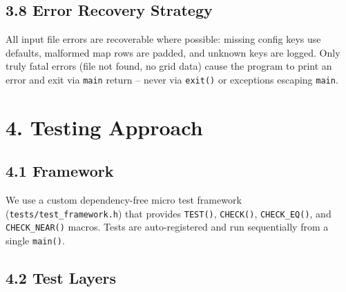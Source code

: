 \documentclass[12pt,a4paper]{article}
\begin{document}
\subsection{3.8 Error Recovery Strategy}

All input file errors are recoverable where possible: missing config keys use
defaults, malformed map rows are padded, and unknown keys are logged. Only truly
fatal errors (file not found, no grid data) cause the program to print an error
and exit via \texttt{main} return -- never via \texttt{exit()} or exceptions
escaping \texttt{main}.

\section{4. Testing Approach}

\subsection{4.1 Framework}

We use a custom dependency-free micro test framework (\texttt{tests/test\_framework.h})
that provides \texttt{TEST()}, \texttt{CHECK()}, \texttt{CHECK\_EQ()}, and
\texttt{CHECK\_NEAR()} macros. Tests are auto-registered and run sequentially
from a single \texttt{main()}.

\subsection{4.2 Test Layers}
\end{document}
